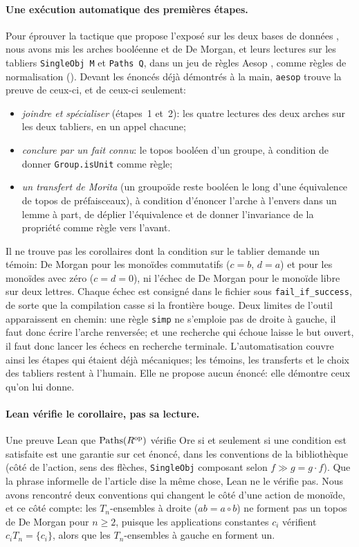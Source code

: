 \paragraph{Une exécution automatique des premières étapes.} Pour éprouver la tactique que propose l'exposé sur les deux bases de données \cite[transparent 17]{caramello-mines}, nous avons mis les arches booléenne et de De Morgan, et leurs lectures sur les tabliers \texttt{SingleObj M} et \texttt{Paths Q}, dans un jeu de règles Aesop \cite{aesop}, comme règles de normalisation (). Devant les énoncés déjà démontrés à la main, \texttt{aesop} trouve la preuve de ceux-ci, et de ceux-ci seulement:
\begin{itemize}
\item \emph{joindre et spécialiser} (étapes~1 et~2): les quatre lectures des deux arches sur les deux tabliers, en un appel chacune;
\item \emph{conclure par un fait connu}: le topos booléen d'un groupe, à condition de donner \texttt{Group.isUnit} comme règle;
\item \emph{un transfert de Morita} (un groupoïde reste booléen le long d'une équivalence de topos de préfaisceaux), à condition d'énoncer l'arche à l'envers dans un lemme à part, de déplier l'équivalence et de donner l'invariance de la propriété comme règle vers l'avant.
\end{itemize}
Il ne trouve pas les corollaires dont la condition sur le tablier demande un témoin: De Morgan pour les monoïdes commutatifs ($c=b$, $d=a$) et pour les monoïdes avec zéro ($c=d=0$), ni l'échec de De Morgan pour le monoïde libre sur deux lettres. Chaque échec est consigné dans le fichier sous \texttt{fail\_if\_success}, de sorte que la compilation casse si la frontière bouge. Deux limites de l'outil apparaissent en chemin: une règle \texttt{simp} ne s'emploie pas de droite à gauche, il faut donc écrire l'arche renversée; et une recherche qui échoue laisse le but ouvert, il faut donc lancer les échecs en recherche terminale. L'automatisation couvre ainsi les étapes qui étaient déjà mécaniques; les témoins, les transferts et le choix des tabliers restent à l'humain. Elle ne propose aucun énoncé: elle démontre ceux qu'on lui donne.

\paragraph{Lean vérifie le corollaire, pas sa lecture.} Une preuve Lean que $\mathrm{Paths}(R^{\mathrm{op}})$ vérifie Ore si et seulement si une condition est satisfaite est une garantie sur cet énoncé, dans les conventions de la bibliothèque (côté de l'action, sens des flèches, \texttt{SingleObj} composant selon $f\gg g = g\cdot f$). Que la phrase informelle de l'article dise la même chose, Lean ne le vérifie pas. Nous avons rencontré deux conventions qui changent le côté d'une action de monoïde, et ce côté compte: les $T_n$-ensembles à droite ($ab = a\circ b$) ne forment pas un topos de De Morgan pour $n\ge 2$, puisque les applications constantes $c_i$ vérifient $c_iT_n = \{c_i\}$, alors que les $T_n$-ensembles à gauche en forment un.

